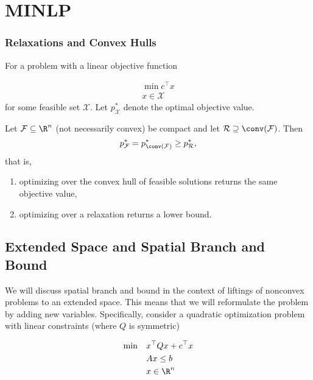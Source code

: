 
\chapter{MINLP}
\newcommand{\lift}{\mathrm{lift}}
\newcommand{\ub}{\mathrm{ubbest}}
\newcommand{\F}{{\mathcal F}}

\subsection{Relaxations and Convex Hulls}

For a problem with a linear objective function

\begin{align}
\min c^\top x\\
 x\in \mathcal X
\end{align}
for some feasible set $\mathcal X$.  Let $p^*_{\mathcal X}$ denote the optimal objective value.
\begin{theorem}
Let $\mathcal F \subseteq \R^n$ (not necessarily convex) be compact and let $\mathcal R \supseteq \conv(\mathcal F)$.  Then 
$$
p^*_\mathcal F = p^*_{\conv(\mathcal{F})} \geq p^*_{\mathcal R},
$$
that is, 
\begin{enumerate}
\item optimizing over the convex hull of feasible solutions returns the same objective value,
\item optimizing over a relaxation returns a lower bound.
\end{enumerate}
\end{theorem}

\section{Extended Space and Spatial Branch and Bound}
We will discuss spatial branch and bound in the context of liftings of nonconvex problems to an extended space.  This means that we will reformulate the problem by adding new variables.  Specifically,  consider a quadratic optimization problem with linear constraints (where $Q$ is symmetric)

\begin{align}
\min\quad  &x^\top Q x + c^\top x\\
&Ax \leq b\\
&x \in \R^n
\end{align}

